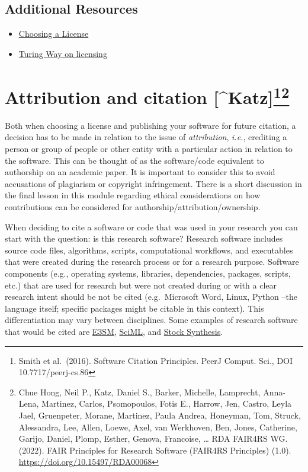 \documentclass[
  letterpaper,
  DIV=11,
  numbers=noendperiod]{scrreport}
\providecommand{\tightlist}{%
  \setlength{\itemsep}{0pt}\setlength{\parskip}{0pt}}\usepackage{longtable,booktabs,array}
\begin{document}
\hypertarget{additional-resources}{%
\subsection{Additional Resources}\label{additional-resources}}

\begin{itemize}
\tightlist
\item
  \href{https://choosealicense.com}{Choosing a License}
\item
  \href{https://the-turing-way.netlify.app/reproducible-research/licensing.html}{Turing
  Way on licensing}
\end{itemize}

\hypertarget{attribution-and-citation-katzsmithchue}{%
\section[Attribution and citation
{[}\^{}Katz{]}]{\texorpdfstring{Attribution and citation
{[}\^{}Katz{]}\footnote{Smith et al.~(2016). Software Citation
  Principles. PeerJ Comput. Sci., DOI 10.7717/peerj-cs.86}\footnote{Chue
  Hong, Neil P., Katz, Daniel S., Barker, Michelle, Lamprecht,
  Anna-Lena, Martinez, Carlos, Psomopoulos, Fotis E., Harrow, Jen,
  Castro, Leyla Jael, Gruenpeter, Morane, Martinez, Paula Andrea,
  Honeyman, Tom, Struck, Alessandra, Lee, Allen, Loewe, Axel, van
  Werkhoven, Ben, Jones, Catherine, Garijo, Daniel, Plomp, Esther,
  Genova, Francoise, \ldots{} RDA FAIR4RS WG. (2022). FAIR Principles
  for Research Software (FAIR4RS Principles) (1.0).
  \url{https://doi.org/10.15497/RDA00068}}}{Attribution and citation {[}\^{}Katz{]}}}\label{attribution-and-citation-katzsmithchue}}

Both when choosing a license and publishing your software for future
citation, a decision has to be made in relation to the issue of
\emph{attribution}, \emph{i.e.}, crediting a person or group of people
or other entity with a particular action in relation to the software.
This can be thought of as the software/code equivalent to authorship on
an academic paper. It is important to consider this to avoid accusations
of plagiarism or copyright infringement. There is a short discussion in
the final lesson in this module regarding ethical considerations on how
contributions can be considered for authorship/attribution/ownership.

When deciding to cite a software or code that was used in your research
you can start with the question: is this research software? Research
software includes source code files, algorithms, scripts, computational
workflows, and executables that were created during the research process
or for a research purpose. Software components (e.g., operating systems,
libraries, dependencies, packages, scripts, etc.) that are used for
research but were not created during or with a clear research intent
should be not be cited (e.g.~Microsoft Word, Linux, Python --the
language itself; specific packages might be citable in this context).
This differentiation may vary between disciplines. Some examples of
research software that would be cited are
\href{https://e3sm.org/}{E3SM}, \href{https://sciml.ai/}{SciML}, and
\href{https://github.com/nmfs-stock-synthesis/stock-synthesis}{Stock
Synthesis}.
\end{document}
